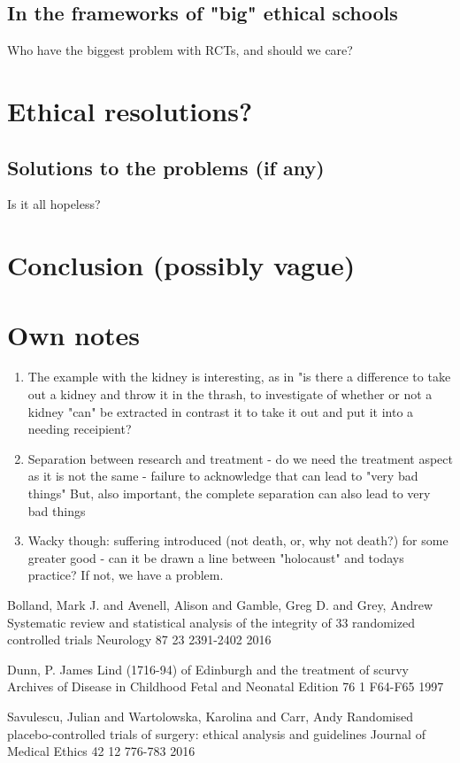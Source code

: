 \documentclass[12p]{article}
\begin{document}
\subsection*{In the frameworks of "big" ethical schools}
Who have the biggest problem with RCTs, and should we care?


\section*{Ethical resolutions?}
\subsection*{Solutions to the problems (if any)}
Is it all hopeless?
\section*{Conclusion (possibly vague)}

\section*{Own notes}

\begin{enumerate}

\item
  The example with the kidney is interesting, as in "is there a difference to take out a kidney 
  and throw it in the thrash, to investigate of whether or not a kidney "can" be extracted in contrast
  it to take it out and put it into a needing receipient?
\item
  Separation between research and treatment - do we need the treatment aspect as it is not the same - failure to acknowledge that can lead to "very bad things"
  But, also important, the complete separation can also lead to very bad things
\item
  Wacky though: suffering introduced (not death, or, why not death?) for some greater good - can it be drawn a line between "holocaust" and todays practice? 
  If not, we have a problem.
  
  \end{enumerate}

\begin{thebibliography}{9}

Bolland, Mark J. and Avenell, Alison and Gamble, Greg D. and Grey, Andrew
Systematic review and statistical analysis of the integrity of 33 randomized controlled trials
Neurology
87
23
2391-2402
2016

Dunn, P.
James Lind (1716-94) of Edinburgh and the treatment of scurvy
Archives of Disease in Childhood Fetal and Neonatal Edition
76
1
F64-F65
1997

Savulescu, Julian and Wartolowska, Karolina and Carr, Andy
Randomised placebo-controlled trials of surgery: ethical analysis and guidelines
Journal of Medical Ethics
42
12
776-783
2016

\end{thebibliography}
 
\end{document}
